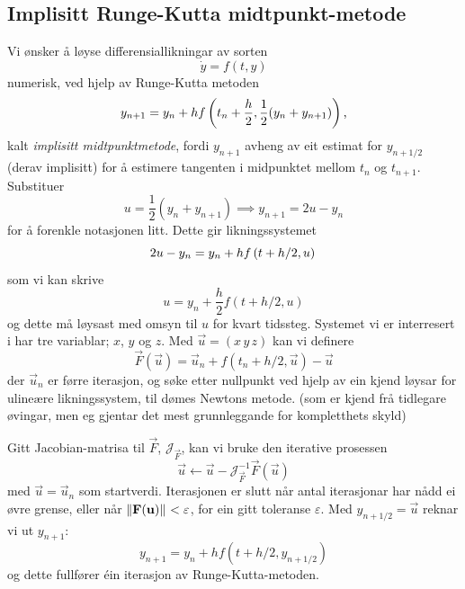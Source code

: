 \documentclass[12pt]{article}
\begin{document}
\begin{multicols}{2}
    \subsection{Implisitt Runge-Kutta midtpunkt-metode}
    Vi ønsker å løyse differensiallikningar av sorten
    \[
        \dot y = f(t, y)
    \]
    numerisk, ved hjelp av Runge-Kutta metoden
    \begin{equation}
        y_{n + 1} = y_n + h f\left( t_n + \frac{h}{2}, \frac{1}{2}(y_n + y_{n + 1})\right) \text,
        \label{mpm}
    \end{equation}
    kalt {\em implisitt midtpunktmetode}, fordi $y_{n+1}$ avheng
    av eit estimat for $y_{n+1/2}$ (derav implisitt)
    for å estimere tangenten i midpunktet mellom $t_n$ og $t_{n+1}$.
    Substituer
    \[
        u = \frac 1 2 (y_n + y_{n + 1}) \implies y_{n+1} = 2u - y_n
    \]
    for å forenkle notasjonen litt.
    Dette gir likningssystemet
    \[
        2u - y_n = y_n + h f\left( t + h/2, u \right) \\
    \]
    som vi kan skrive
    \begin{equation}
        u = y_n + \frac h 2 f\left( t+h/2, u \right)
    \end{equation}
    og dette må løysast med omsyn til $u$ for kvart tidssteg.
    Systemet vi er interresert i har tre variablar; $x$, $y$ og $z$.
    Med $\vec u = (x \, y \, z)$ kan vi definere
    \begin{equation}
        \vec F(\vec u) = \vec u_n + f(t_n + h/2, \vec u) - \vec u
    \end{equation}
    der $\vec u_n$ er førre iterasjon,
    og søke etter nullpunkt ved hjelp av ein kjend
    løysar for ulineære likningssystem, til dømes Newtons metode.
    (som er kjend frå tidlegare øvingar, men eg gjentar det
    mest grunnleggande for kompletthets skyld)

    Gitt Jacobian-matrisa til $\vec F$, $\mathscr J_\vec F$,
    kan vi bruke den iterative prosessen
    \[
        \vec u \longleftarrow \vec u - \mathscr J^{-1}_\vec F \vec F(\vec u)
    \]
    med $\vec u = \vec u_n$ som startverdi.
    Iterasjonen er slutt når antal iterasjonar har nådd ei øvre grense,
    eller når $\left\lVert{\mathbf{F}}({\mathbf{u}})\right\rVert_{} < \varepsilon$,
    for ein gitt toleranse $\varepsilon$.
    Med $y_{n+1/2} = \vec u$ reknar vi ut $y_{n+1}$:
    \begin{equation}
        \label{impl_RK}
        y_{n+1} = y_n + h f\left(t + h/2, y_{n+1/2}\right)
    \end{equation}
    og dette fullfører \'ein iterasjon av Runge-Kutta-metoden.




\end{multicols}
\end{document}
